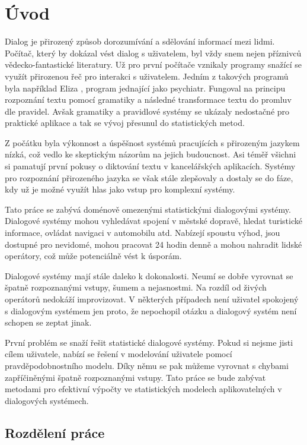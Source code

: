 \chapter*{Úvod}

Dialog je přirozený způsob dorozumívání a sdělování informací mezi lidmi.
Počítač, který by dokázal vést dialog s uživatelem, byl vždy snem nejen příznivců vědecko-fantastické literatury.
Už pro první počítače vznikaly programy snažící se využít přirozenou řeč pro interakci s uživatelem.
Jedním z takových programů byla například Eliza \cite{weizenbaum1966eliza}, program jednající jako psychiatr.
Fungoval na principu rozpoznání textu pomocí gramatiky a následné transformace textu do promluv dle pravidel.
Avšak gramatiky a pravidlové systémy se ukázaly nedostačné pro praktické aplikace a tak se vývoj přesunul do statistických metod.

Z počátku byla výkonnost a úspěšnost systémů pracujících s přirozeným jazykem nízká, což vedlo ke skeptickým názorům na jejich budoucnost.
Asi téměř všichni si pamatují první pokusy o diktování textu v kancelářských aplikacích.
Systémy pro rozpoznání přirozeného jazyka se však stále zlepšovaly a dostaly se do fáze, kdy už je možné využít hlas jako vstup pro komplexní systémy.

Tato práce se zabývá doménově omezenými statistickými dialogovými systémy.
Dialogové systémy mohou vyhledávat spojení v městské dopravě, hledat turistické informace, ovládat navigaci v automobilu atd.
Nabízejí spoustu výhod, jsou dostupné pro nevidomé, mohou pracovat 24 hodin denně a mohou nahradit lidské operátory, což může potenciálně vést k úsporám.

Dialogové systémy mají stále daleko k dokonalosti.
Neumí se dobře vyrovnat se špatně rozpoznanými vstupy, šumem a nejasnostmi.
Na rozdíl od živých operátorů nedokáží improvizovat.
V některých případech není uživatel spokojený s dialogovým systémem jen proto, že nepochopil otázku a dialogový systém není schopen se zeptat jinak.

První problém se snaží řešit statistické dialogové systémy.
Pokud si nejsme jisti cílem uživatele, nabízí se řešení v modelování uživatele pomocí pravděpodobnostního modelu.
Díky němu se pak můžeme vyrovnat s chybami zapříčiněnými špatně rozpoznanými vstupy.
Tato práce se bude zabývat metodami pro efektivní výpočty ve statistických modelech aplikovatelných v dialogových systémech.

\section*{Rozdělení práce}

